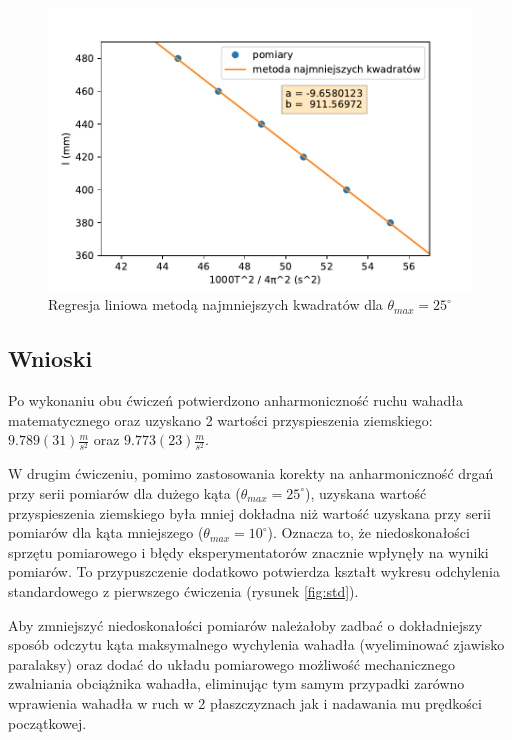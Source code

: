 \documentclass[a4paper]{article}
\newlength{\du}
\begin{document}
\begin{figure}[h]
\centering
	\includegraphics[scale=0.6]{wykres-4_0.pdf}
\caption{Regresja liniowa metodą najmniejszych kwadratów dla $\theta_{max} = 25^\circ$}
\label{regresja_25}
\end{figure}


\subsection{Wnioski}
Po wykonaniu obu ćwiczeń potwierdzono anharmoniczność ruchu wahadła matematycznego oraz uzyskano 2 wartości przyspieszenia ziemskiego: $9.789(31) \tfrac{m}{s^2}$ oraz $9.773(23) \tfrac{m}{s^2}$.

W drugim ćwiczeniu, pomimo zastosowania korekty na anharmoniczność drgań przy serii pomiarów dla dużego kąta ($\theta_{max} = 25^\circ$), uzyskana
wartość przyspieszenia ziemskiego była mniej dokładna niż wartość uzyskana
przy serii pomiarów dla kąta mniejszego ($\theta_{max} = 10^\circ$).
Oznacza to, że niedoskonałości sprzętu pomiarowego i błędy eksperymentatorów
znacznie wpłynęły na wyniki pomiarów.
To przypuszczenie dodatkowo potwierdza kształt wykresu odchylenia standardowego z pierwszego ćwiczenia (rysunek \ref{fig:std}).

Aby zmniejszyć niedoskonałości pomiarów należałoby zadbać o dokładniejszy sposób odczytu
kąta maksymalnego wychylenia wahadła (wyeliminować zjawisko paralaksy) oraz dodać do
układu pomiarowego możliwość mechanicznego zwalniania obciążnika wahadła, eliminując tym
samym przypadki zarówno wprawienia wahadła w ruch w 2 płaszczyznach 
jak i nadawania mu prędkości początkowej.
\end{document}
